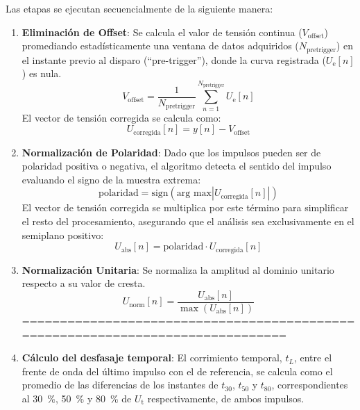 Las etapas se ejecutan secuencialmente de la siguiente manera:
\begin{enumerate}
    \item \textbf{Eliminación de Offset}: Se calcula el valor de tensión continua ($V_{\text{offset}}$) promediando estadísticamente una ventana de datos adquiridos ($N_{\text{pretrigger}}$) en el instante previo al disparo (``pre-trigger''), donde la curva registrada ($U_\text{e}[n]$) es nula.
    \begin{equation}
        \label{eq:calculo_offset}
        V_{\text{offset}} = \frac{1}{N_{\text{pretrigger}}} \sum_{n=1}^{N_{\text{pretrigger}}} U_\text{e}[n]
    \end{equation}
    El vector de tensión corregida se calcula como:
    \begin{equation}
        \label{eq:eliminacion_offset}
        U_{\text{corregida}}[n] = y[n] - V_{\text{offset}}
    \end{equation}
    \item \textbf{Normalización de Polaridad}: Dado que los impulsos pueden ser de polaridad positiva o negativa, el algoritmo detecta el sentido del impulso evaluando el signo de la muestra extrema:
    \begin{equation}
        \label{eq:buscar_polaridad}
        \text{polaridad} = \text{sign}(\text{arg max} |U_{\text{corregida}}[n]|)
    \end{equation}
    El vector de tensión corregida se multiplica por este término para simplificar el resto del procesamiento, asegurando que el análisis sea exclusivamente en el semiplano positivo:
    \begin{equation}
        \label{eq:normalizacion_polaridad}
        U_{\text{abs}}[n] = \text{polaridad} \cdot U_{\text{corregida}}[n]
    \end{equation}
    \item \textbf{Normalización Unitaria}: Se normaliza la amplitud al dominio unitario respecto a su valor de cresta.
    \begin{equation}
        \label{eq:onda_normalizada}
        U_{\text{norm}}[n] = \frac{U_{\text{abs}}[n]}{\max(U_{\text{abs}}[n])}
    \end{equation}
===============================================================================
    \item \textbf{Cálculo del desfasaje temporal}: El corrimiento temporal, $t_L$, entre el frente de onda del último impulso con el de referencia, se calcula como el promedio de las diferencias de los instantes de $t_{30}$, $t_{50}$ y $t_{80}$, correspondientes al \qty{30}{\percent}, \qty{50}{\percent} y \qty{80}{\percent} de $U_\text{t}$ respectivamente, de ambos impulsos.

\end{enumerate}
